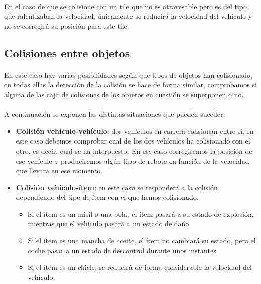 \paragraph{}
En el caso de que se colisione con un tile que no es atravesable pero es del tipo que ralentizaban la velocidad, únicamente
se reducirá la velocidad del vehículo y no se corregirá su posición para este tile.

\subsection{Colisiones entre objetos}

\paragraph{}
En este caso hay varias posibilidades según que tipos de objetos han colisionado, en todas ellas la detección de la colisión
se hace de forma similar, comprobamos si alguna de las caja de colisiones de los objetos en cuestión se superponen o no.

\paragraph{}
A continuación se exponen las distintas situaciones que pueden suceder:

\begin{itemize}
    \item \textbf{Colisión vehículo-vehículo}: dos vehículos en carrera colisionan entre sí, en este caso debemos comprobar 
    cual de los dos vehículos ha colisionado con el otro, es decir, cual se ha interpuesto. En ese caso 
    corregiremos la posición de ese vehículo y produciremos algún tipo de rebote en función de la velocidad que llevara
    en ese momento.
    
    \item \textbf{Colisión vehículo-ítem}: en este caso se responderá a la
    colisión dependiendo del tipo de ítem con el que
    hemos colisionado.
    \begin{itemize}
        \item Si el ítem es un misil o una bola, el ítem pasará a su estado de
        explosión, mientras que el vehículo pasará a un estado de daño
        
        \item Si el ítem es una mancha de aceite, el ítem no cambiará su estado, pero el coche pasar a un estado de descontrol durante
        unos instantes
        
        \item Si el ítem es un chicle, se reducirá de forma considerable la velocidad del vehículo.
    \end{itemize}
\end{itemize}

